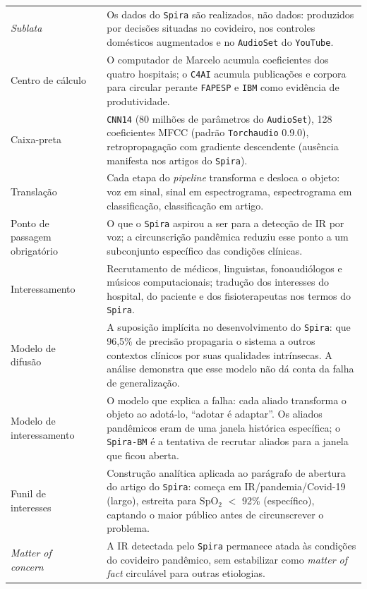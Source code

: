 \begin{longtable}{p{2.8cm}p{3.2cm}p{7.5cm}}
\addlinespace
\textit{Sublata} & \parencite{Latour2017Esperanca} & Os dados do \texttt{Spira} são realizados, não dados: produzidos por decisões situadas no covideiro, nos controles domésticos augmentados e no \texttt{AudioSet} do \texttt{YouTube}. \\
\addlinespace
Centro de cálculo & \parencite{Latour2011CienciaEmAcao} & O computador de Marcelo acumula coeficientes dos quatro hospitais; o \texttt{C4AI} acumula publicações e corpora para circular perante \texttt{FAPESP} e \texttt{IBM} como evidência de produtividade. \\
\addlinespace
Caixa-preta & \parencite{Latour2011CienciaEmAcao} & \texttt{CNN14} (80 milhões de parâmetros do \texttt{AudioSet}), 128 coeficientes MFCC (padrão \texttt{Torchaudio} 0.9.0), retropropagação com gradiente descendente (ausência manifesta nos artigos do \texttt{Spira}). \\
\addlinespace
Translação & \parencite{Latour2011CienciaEmAcao} & Cada etapa do \textit{pipeline} transforma e desloca o objeto: voz em sinal, sinal em espectrograma, espectrograma em classificação, classificação em artigo. \\
\addlinespace
Ponto de passagem obrigatório & \parencite{Latour2011CienciaEmAcao} & O que o \texttt{Spira} aspirou a ser para a detecção de IR por voz; a circunscrição pandêmica reduziu esse ponto a um subconjunto específico das condições clínicas. \\
\addlinespace
Interessamento & \parencite{Callon1986Mapping,AkrichCallonLatour2002} & Recrutamento de médicos, linguistas, fonoaudiólogos e músicos computacionais; tradução dos interesses do hospital, do paciente e dos fisioterapeutas nos termos do \texttt{Spira}. \\
\addlinespace
Modelo de difusão & \parencite{AkrichCallonLatour2002} & A suposição implícita no desenvolvimento do \texttt{Spira}: que 96,5\% de precisão propagaria o sistema a outros contextos clínicos por suas qualidades intrínsecas. A análise demonstra que esse modelo não dá conta da falha de generalização. \\
\addlinespace
Modelo de interessamento & \parencite{AkrichCallonLatour2002} & O modelo que explica a falha: cada aliado transforma o objeto ao adotá-lo, \enquote{adotar é adaptar}. Os aliados pandêmicos eram de uma janela histórica específica; o \texttt{Spira-BM} é a tentativa de recrutar aliados para a janela que ficou aberta. \\
\addlinespace
Funil de interesses & \parencite{Callon1986Mapping} & Construção analítica aplicada ao parágrafo de abertura do artigo do \texttt{Spira}: começa em IR/pandemia/Covid-19 (largo), estreita para SpO$_2$ $<$ 92\% (específico), captando o maior público antes de circunscrever o problema. \\
\addlinespace
\textit{Matter of concern} & \parencite{latour2004politics} & A IR detectada pelo \texttt{Spira} permanece atada às condições do covideiro pandêmico, sem estabilizar como \textit{matter of fact} circulável para outras etiologias. \\
\end{longtable}


